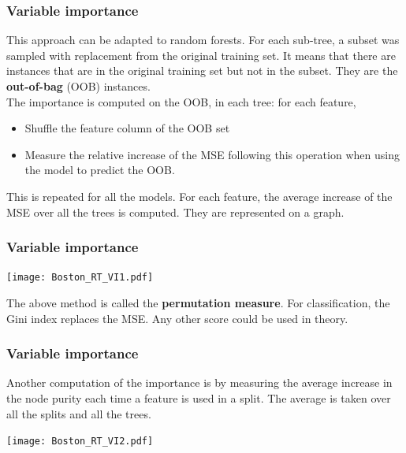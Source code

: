 \begin{frame}
\frametitle{Variable importance}
This approach can be adapted to random forests. For each sub-tree, a subset was sampled with replacement from the original training set. It means that there are instances that are in the original training set but not in the subset. They are the {\bf out-of-bag} (OOB) instances. \\
\vspace{0.3cm}
The importance is computed on the OOB, in each tree: for each feature, 
\begin{itemize}
\item Shuffle the feature column of the OOB set
\item Measure the relative increase of the MSE following this operation when using the model to predict the OOB.
\end{itemize}
This is repeated for all the models. For each feature, the average increase of the MSE over all the trees is computed. They are represented on a graph.
\end{frame}
\begin{frame}
\frametitle{Variable importance}
\begin{center}
\texttt{[image: Boston\_RT\_VI1.pdf]}
\end{center}
The above method is called the {\bf permutation measure}. For classification, the Gini index replaces the MSE. Any other score could be used in theory.
\end{frame}
\begin{frame}
\frametitle{Variable importance}
Another computation of the importance is by measuring the average increase in the node purity each time a feature is used in a split. The average is taken over all the splits and all the trees. 
\begin{center}
\texttt{[image: Boston\_RT\_VI2.pdf]}
\end{center}
\end{frame}


